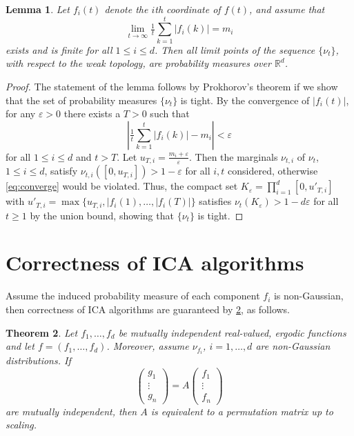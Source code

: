 \documentclass[english]{article} %
\newcommand{\real}{\mathbb{R}}
\newcounter{assumption}%
\newtheorem{lemma}{Lemma}[section]
\newtheorem{thm}[lemma]{Theorem}
\theoremstyle{definition}
\newcommand{\eps}{\varepsilon}
\begin{document}
\begin{lemma}
\label{lem:ergodicfunction}
Let $f_i(t)$ denote the $i$th coordinate of $f(t)$, and assume that
\begin{equation}
\label{eq:ergodicproperty}
\lim_{t\to\infty} \tfrac{1}{t}\sum_{k=1}^t |f_i(k)|=m_i
\end{equation}
exists and is finite for all $1 \le i \le d$.
Then all limit points of the sequence $\{\nu_t\}$, with respect to the weak topology, are probability measures over $\real^d$.
\end{lemma}
\begin{proof}
The statement of the lemma follows by Prokhorov's theorem if we show that the set of probability measures $\{\nu_t\}$ is tight.
By the convergence of $|f_i(t)|$, for any $\eps>0$ there exists a $T>0$ such that
\begin{equation}
\label{eq:converge}
\left| \tfrac{1}{t} \sum_{k=1}^t |f_i(k)| - m_i \right| <\eps
\end{equation}
for all $1 \le i \le d$ and $t>T$. Let $u_{T,i}=\tfrac{m_i+\eps}{\eps}$. Then the marginals
$\nu_{t,i}$ of $\nu_t$, $1\le i \le d$, satisfy $\nu_{t,i}([0,u_{T,i}]) > 1-\eps$ for all $i,t$ considered, otherwise \eqref{eq:converge} would be violated. Thus, the compact set
$K_{\eps}=\prod_{i=1}^d [0,u'_{T,i}]$ with $u'_{T,i}=\max\{u_{T,i},|f_i(1),\ldots,|f_i(T)|\}$ satisfies
$\nu_t(K_{\eps})>1-d \eps$ for all $t \ge 1$ by the union bound, showing that $\{\nu_t\}$ is tight.
\end{proof}
\fi


\section{Correctness of ICA algorithms}
Assume the induced probability measure of each component $f_i$ is non-Gaussian, then correctness of ICA algorithms are guaranteed by \cref{thm:CorofICA}, as follows.
\begin{thm}
\label{thm:CorofICA}
Let $f_1,\ldots,f_d$ be mutually independent real-valued, ergodic functions and let $f = (f_1,\ldots,f_d)$.
Moreover, assume $\nu_{f_i}$, $i=1,\ldots,d$ are non-Gaussian distributions. If
\begin{equation}
\left(
\begin{array}{ccc}
g_1 \\
\vdots \\
g_n
\end{array}
\right) = A
\left(
\begin{array}{ccc}
f_1 \\
\vdots \\
f_n
\end{array}
\right)
\end{equation}
are mutually independent, then $A$ is equivalent to a permutation matrix up to scaling.
\end{thm}
\end{document}
